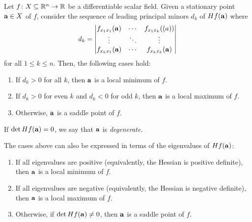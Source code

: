 \documentclass{article}
\begin{document}
\begin{theorem}
  Let $f \colon X \subseteq \mathbb{R}^n \to \mathbb{R}$ be a differentiable scalar field.
  Given a stationary point $\mathbf{a} \in X$ of $f$, consider the sequence of leading principal minors $d_k$ of $Hf(\mathbf{a})$ where
  \begin{align}
    d_k = \begin{vmatrix} f_{x_1 x_1}(\mathbf{a}) & \cdots & f_{x_1 x_k}(\mathbf(a))
                \\
                \vdots                & \ddots & \vdots
                \\
                f_{x_k x_1}(\mathbf{a}) & \cdots & f_{x_k x_k}(\mathbf{a})
          \end{vmatrix}
  \end{align}
  for all $1 \leq k \leq n$.
  Then, the following cases hold:
  \begin{enumerate}
    \item If $d_k > 0$ for all $k$, then $\mathbf{a}$ is a local minimum of $f$.
    \item If $d_k > 0$ for even $k$ and $d_k < 0$ for odd $k$, then $\mathbf{a}$ is a local maximum of $f$.
    \item Otherwise, $\mathbf{a}$ is a saddle point of $f$.
  \end{enumerate}
  If $\det Hf(\mathbf{a}) = 0$, we say that $\mathbf{a}$ is \emph{degenerate}.
\end{theorem}
The cases above can also be expressed in terms of the eigenvalues of $Hf(\mathbf{a})$:
\begin{enumerate}
  \item If all eigenvalues are positive (equivalently, the Hessian is positive definite), then $\mathbf{a}$ is a local minimum of $f$.
  \item If all eigenvalues are negative (equivalently, the Hessian is negative definite), then $\mathbf{a}$ is a local maximum of $f$.
  \item Otherwise, if $\det Hf(\mathbf{a}) \neq 0$, then $\mathbf{a}$ is a saddle point of $f$.
\end{enumerate}
\end{document}
